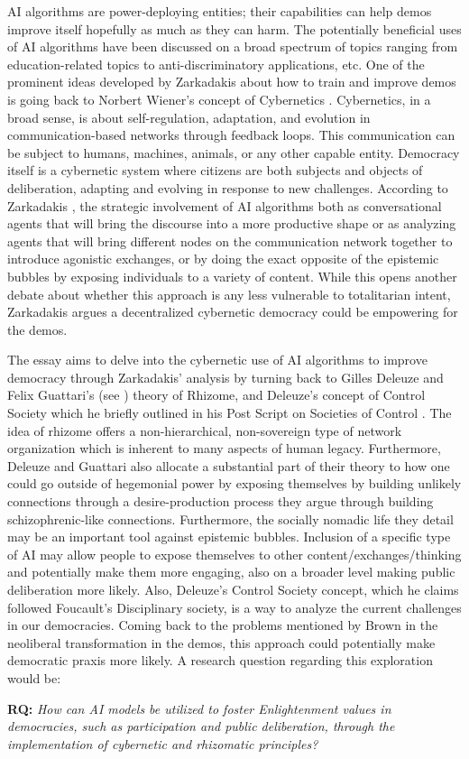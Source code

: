 \documentclass[nobib]{tufte-book}
\theoremstyle{mytheoremstyle}
\theoremstyle{mytheoremstyle}
\theoremstyle{myproblemstyle}
\begin{document}
AI algorithms are power-deploying entities; their capabilities can help demos improve itself hopefully as much as they can harm. The potentially beneficial uses of AI algorithms have been discussed on a broad spectrum of topics ranging from education-related topics to anti-discriminatory applications, etc. One of the prominent ideas developed by Zarkadakis \parencite*{zarkadakes2020} about how to train and improve demos is going back to Norbert Wiener's concept of Cybernetics \parencite{Wiener1948}. Cybernetics, in a broad sense, is about self-regulation, adaptation, and evolution in communication-based networks through feedback loops. This communication can be subject to humans, machines, animals, or any other capable entity. Democracy itself is a cybernetic system where citizens are both subjects and objects of deliberation, adapting and evolving in response to new challenges. According to Zarkadakis \cite*{zarkadakes2020}, the strategic involvement of AI algorithms both as conversational agents that will bring the discourse into a more productive shape or as analyzing agents that will bring different nodes on the communication network together to introduce agonistic exchanges, or by doing the exact opposite of the epistemic bubbles by exposing individuals to a variety of content. While this opens another debate about whether this approach is any less vulnerable to totalitarian intent, Zarkadakis argues a decentralized cybernetic democracy could be empowering for the demos.

The essay aims to delve into the cybernetic use of AI algorithms to improve democracy through Zarkadakis' analysis by turning back to Gilles Deleuze and Felix Guattari's (see \cite*{deleuze1983, deleuze1987}) theory of Rhizome, and Deleuze's concept of Control Society which he briefly outlined in his Post Script on Societies of Control \parencite{deleuze1992a}. The idea of rhizome offers a non-hierarchical, non-sovereign type of network organization which is inherent to many aspects of human legacy. Furthermore, Deleuze and Guattari also allocate a substantial part of their theory to how one could go outside of hegemonial power by exposing themselves by building unlikely connections through a desire-production process they argue through building schizophrenic-like connections. Furthermore, the socially nomadic life they detail may be an important tool against epistemic bubbles. Inclusion of a specific type of AI may allow people to expose themselves to other content/exchanges/thinking and potentially make them more engaging, also on a broader level making public deliberation more likely. Also, Deleuze's Control Society concept, which he claims followed Foucault's Disciplinary society, is a way to analyze the current challenges in our democracies. Coming back to the problems mentioned by Brown in the neoliberal transformation in the demos, this approach could potentially make democratic praxis more likely. A research question regarding this exploration would be:

\textbf{RQ:} \textit{How can AI models be utilized to foster Enlightenment values in democracies, such as participation and public deliberation, through the implementation of cybernetic and rhizomatic principles?}


\printbibliography
\end{document}

